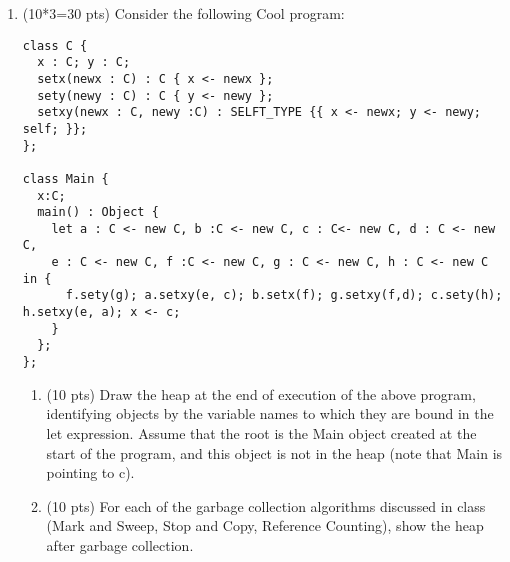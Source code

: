 \documentclass[10pt]{article}
\begin{document}
\begin{enumerate}
\pagebreak

\item (10*3=30 pts) Consider the following Cool program:

\begin{verbatim}
class C {
  x : C; y : C;
  setx(newx : C) : C { x <- newx };
  sety(newy : C) : C { y <- newy };
  setxy(newx : C, newy :C) : SELFT_TYPE {{ x <- newx; y <- newy; self; }};
};

class Main {
  x:C;
  main() : Object {
    let a : C <- new C, b :C <- new C, c : C<- new C, d : C <- new C,
    e : C <- new C, f :C <- new C, g : C <- new C, h : C <- new C in {
      f.sety(g); a.setxy(e, c); b.setx(f); g.setxy(f,d); c.sety(h); h.setxy(e, a); x <- c;
    }
  };
};
\end{verbatim}
\begin{enumerate}
  \item (10 pts) Draw the heap at the end of execution of the above program, identifying objects by the variable names to which they are bound in the let expression. Assume that the root is the Main object created at the start of the program, and this object is not in the heap (note that Main is pointing to c).

\begin{center}\end{center}

  \item (10 pts) For each of the garbage collection algorithms discussed in class (Mark and Sweep, Stop and Copy, Reference Counting), show the heap after garbage collection.


\end{enumerate}
\end{enumerate}
\end{document}
